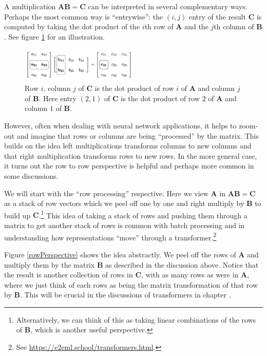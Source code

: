 A multiplication $\mathbf{A}\mathbf{B} = \mathbf{C}$ can be interpreted in several complementary ways. Perhaps the most common way is ``entrywise'': the $(i,j)$ entry of the result $\mathbf{C}$ is computed by taking the dot product of the $i$th row of $\mathbf{A}$ and the $j$th column of $\mathbf{B}$. See figure \ref{entryWiseMatrixProduct} for an illustration. 

\begin{figure}[h]
\centering
\includegraphics[width=0.5\textwidth]{images/matrixProductEntryWise.png}
\caption[Jeff Yoshimi.]{Row $i$, column $j$ of $\mathbf{C}$ is the dot product of row $i$ of $\mathbf{A}$ and column $j$ of $\mathbf{B}$. Here entry $(2,1)$ of $\mathbf{C}$ is the dot product of row $2$ of $\mathbf{A}$ and column $1$ of $\mathbf{B}$.}
\label{entryWiseMatrixProduct}
\end{figure}

However, often when dealing with neural network applications, it helps to zoom-out and imagine that rows or columns are being ``processed'' by the matrix. This builds on the idea left multiplications transforms columns to new columns and that right multiplication transforms rows to new rows. In the more general case, it turns out the row to row perspective is helpful and perhaps more common in some discussions. 

We will start with the ``row processing'' respective. Here we view $\mathbf{A}$ in  $\mathbf{A}\mathbf{B} = \mathbf{C}$ as a stack of row vectors which we peel off one by one and right multiply by $\mathbf{B}$ to build up $\mathbf{C}$.\footnote{Alternatively, we can think of this as taking linear combinations of the rows of $\mathbf{B}$, which is another useful perspective.} This idea of taking a stack of rows and pushing them through a matrix to get another stack of rows is common with batch processing and in understanding how representations ``move'' through a transformer.\footnote{See \url{ https://e2eml.school/transformers.html}.}

Figure \ref{rowPerspective} shows the idea abstractly. We peel off the rows of $\mathbf{A}$ and multiply them by the matrix $\mathbf{B}$ as described in the discussion above. Notice that the result is another collection of rows in $\mathbf{C}$, with as many rows as were in $\mathbf{A}$, where we just think of each rows as being the matrix transformation of that row by $\mathbf{B}$. This will be crucial in the discussions of transformers in chapter . 

